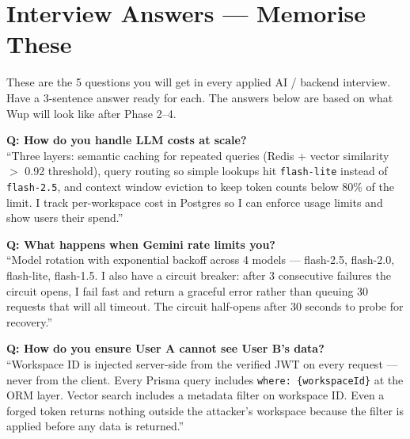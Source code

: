 \documentclass[11pt, a4paper]{article}
\begin{document}
\section{Interview Answers — Memorise These}

\begin{purplebox}
These are the 5 questions you will get in every applied AI / backend interview. Have a 3-sentence answer ready for each. The answers below are based on what Wup will look like after Phase 2--4.
\end{purplebox}

\vspace{8pt}

\noindent\textbf{Q: How do you handle LLM costs at scale?}\\
``Three layers: semantic caching for repeated queries (Redis + vector similarity $>$ 0.92 threshold), query routing so simple lookups hit \texttt{flash-lite} instead of \texttt{flash-2.5}, and context window eviction to keep token counts below 80\% of the limit. I track per-workspace cost in Postgres so I can enforce usage limits and show users their spend.''

\vspace{8pt}

\noindent\textbf{Q: What happens when Gemini rate limits you?}\\
``Model rotation with exponential backoff across 4 models — flash-2.5, flash-2.0, flash-lite, flash-1.5. I also have a circuit breaker: after 3 consecutive failures the circuit opens, I fail fast and return a graceful error rather than queuing 30 requests that will all timeout. The circuit half-opens after 30 seconds to probe for recovery.''

\vspace{8pt}

\noindent\textbf{Q: How do you ensure User A cannot see User B's data?}\\
``Workspace ID is injected server-side from the verified JWT on every request — never from the client. Every Prisma query includes \texttt{where: \{workspaceId\}} at the ORM layer. Vector search includes a metadata filter on workspace ID. Even a forged token returns nothing outside the attacker's workspace because the filter is applied before any data is returned.''

\vspace{8pt}
\end{document}
